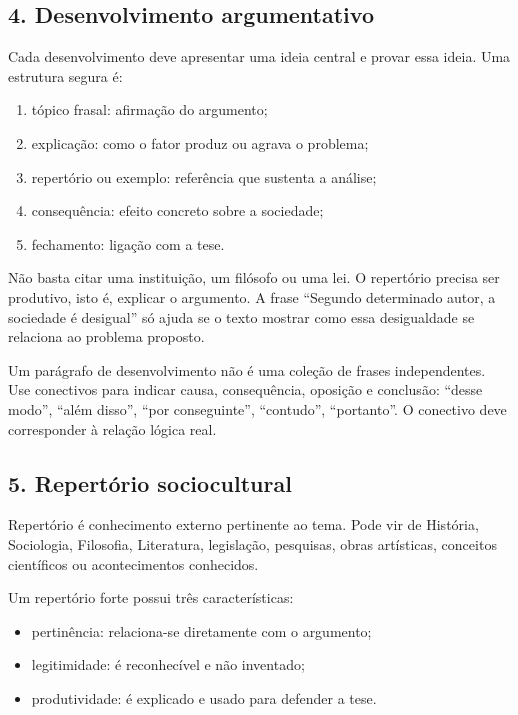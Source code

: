 \documentclass[11pt,a4paper]{article}
\begin{document}
\subsection*{4. Desenvolvimento argumentativo}

Cada desenvolvimento deve apresentar uma ideia central e provar essa ideia. Uma estrutura segura é:

\begin{enumerate}
  \item tópico frasal: afirmação do argumento;
  \item explicação: como o fator produz ou agrava o problema;
  \item repertório ou exemplo: referência que sustenta a análise;
  \item consequência: efeito concreto sobre a sociedade;
  \item fechamento: ligação com a tese.
\end{enumerate}

Não basta citar uma instituição, um filósofo ou uma lei. O repertório precisa ser produtivo, isto é, explicar o argumento. A frase “Segundo determinado autor, a sociedade é desigual” só ajuda se o texto mostrar como essa desigualdade se relaciona ao problema proposto.

Um parágrafo de desenvolvimento não é uma coleção de frases independentes. Use conectivos para indicar causa, consequência, oposição e conclusão: “desse modo”, “além disso”, “por conseguinte”, “contudo”, “portanto”. O conectivo deve corresponder à relação lógica real.

\subsection*{5. Repertório sociocultural}

Repertório é conhecimento externo pertinente ao tema. Pode vir de História, Sociologia, Filosofia, Literatura, legislação, pesquisas, obras artísticas, conceitos científicos ou acontecimentos conhecidos.

Um repertório forte possui três características:

\begin{itemize}
  \item pertinência: relaciona-se diretamente com o argumento;
  \item legitimidade: é reconhecível e não inventado;
  \item produtividade: é explicado e usado para defender a tese.
\end{itemize}
\end{document}
